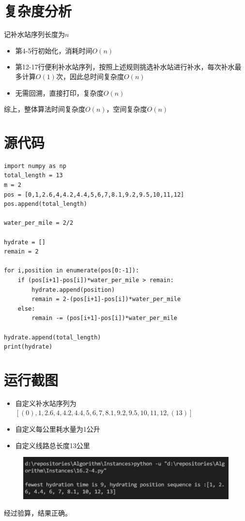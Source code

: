 \documentclass{ctexart}[UTF8]
\begin{document}
    \section{复杂度分析}
    记补水站序列长度为$n$
    \begin{itemize}
        \item 第4-5行初始化，消耗时间$O(n)$
        \item 第12-17行便利补水站序列，按照上述规则挑选补水站进行补水，每次补水最多计算$O(1)$次，因此总时间复杂度$O(n)$
        \item 无需回溯，直接打印，复杂度$O(n)$
    \end{itemize}
    综上，整体算法时间复杂度$O(n)$，空间复杂度$O(n)$
    \section{源代码}
    \begin{lstlisting}
import numpy as np
total_length = 13
m = 2
pos = [0,1,2.6,4,4.2,4.4,5,6,7,8.1,9.2,9.5,10,11,12]
pos.append(total_length)

water_per_mile = 2/2

hydrate = []
remain = 2

for i,position in enumerate(pos[0:-1]):
    if (pos[i+1]-pos[i])*water_per_mile > remain:
        hydrate.append(position)
        remain = 2-(pos[i+1]-pos[i])*water_per_mile
    else:
        remain -= (pos[i+1]-pos[i])*water_per_mile

hydrate.append(total_length)
print(hydrate)
    \end{lstlisting}
    \section{运行截图}
    \begin{itemize}
        \item 自定义补水站序列为$[(0),1,2.6,4,4.2,4.4,5,6,7,8.1,9.2,9.5,10,11,12,(13)]$
        \item 自定义每公里耗水量为1公升
        \item 自定义线路总长度13公里
    \end{itemize}
    \begin{figure}[H]
        \centering
        \includegraphics[width=14cm]{resources/9_1.png}
    \end{figure}
    经过验算，结果正确。
\end{document}

